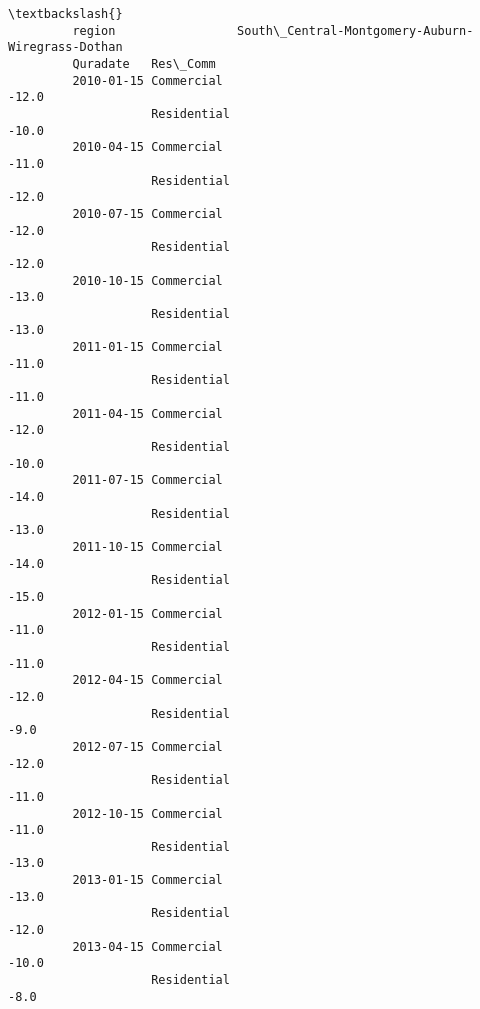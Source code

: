 \documentclass[11pt]{article}
\begin{document}
\begin{Verbatim}[commandchars=\\\{\}]
                                                                                  \textbackslash{}
         region                 South\_Central-Montgomery-Auburn-Wiregrass-Dothan   
         Quradate   Res\_Comm                                                       
         2010-01-15 Commercial                                             -12.0   
                    Residential                                            -10.0   
         2010-04-15 Commercial                                             -11.0   
                    Residential                                            -12.0   
         2010-07-15 Commercial                                             -12.0   
                    Residential                                            -12.0   
         2010-10-15 Commercial                                             -13.0   
                    Residential                                            -13.0   
         2011-01-15 Commercial                                             -11.0   
                    Residential                                            -11.0   
         2011-04-15 Commercial                                             -12.0   
                    Residential                                            -10.0   
         2011-07-15 Commercial                                             -14.0   
                    Residential                                            -13.0   
         2011-10-15 Commercial                                             -14.0   
                    Residential                                            -15.0   
         2012-01-15 Commercial                                             -11.0   
                    Residential                                            -11.0   
         2012-04-15 Commercial                                             -12.0   
                    Residential                                             -9.0   
         2012-07-15 Commercial                                             -12.0   
                    Residential                                            -11.0   
         2012-10-15 Commercial                                             -11.0   
                    Residential                                            -13.0   
         2013-01-15 Commercial                                             -13.0   
                    Residential                                            -12.0   
         2013-04-15 Commercial                                             -10.0   
                    Residential                                             -8.0   

\end{Verbatim}
\end{document}
